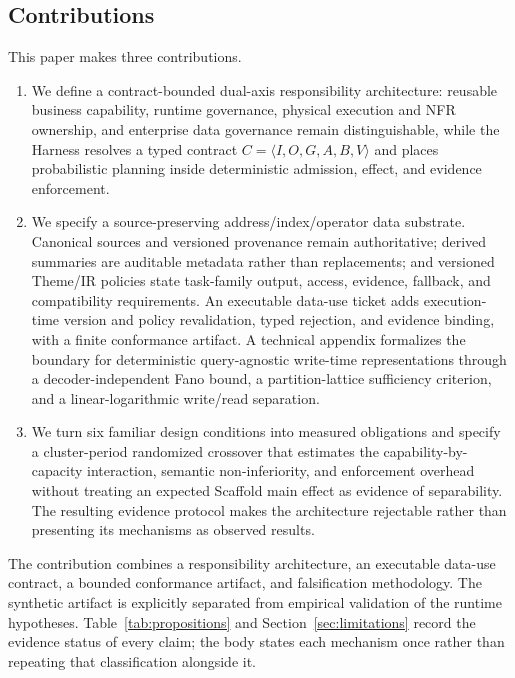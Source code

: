 \subsection{Contributions}

This paper makes three contributions.

\begin{enumerate}
\item We define a contract-bounded dual-axis responsibility architecture: reusable business capability, runtime governance, physical execution and NFR ownership, and enterprise data governance remain distinguishable, while the Harness resolves a typed contract $C=\langle I,O,G,A,B,V\rangle$ and places probabilistic planning inside deterministic admission, effect, and evidence enforcement.
\item We specify a source-preserving address/index/operator data substrate. Canonical sources and versioned provenance remain authoritative; derived summaries are auditable metadata rather than replacements; and versioned Theme/IR policies state task-family output, access, evidence, fallback, and compatibility requirements. An executable data-use ticket adds execution-time version and policy revalidation, typed rejection, and evidence binding, with a finite conformance artifact. A technical appendix formalizes the boundary for deterministic query-agnostic write-time representations through a decoder-independent Fano bound, a partition-lattice sufficiency criterion, and a linear-logarithmic write/read separation.
\item We turn six familiar design conditions into measured obligations and specify a cluster-period randomized crossover that estimates the capability-by-capacity interaction, semantic non-inferiority, and enforcement overhead without treating an expected Scaffold main effect as evidence of separability. The resulting evidence protocol makes the architecture rejectable rather than presenting its mechanisms as observed results.
\end{enumerate}

The contribution combines a responsibility architecture, an executable data-use contract, a bounded conformance artifact, and falsification methodology. The synthetic artifact is explicitly separated from empirical validation of the runtime hypotheses. Table~\ref{tab:propositions} and Section~\ref{sec:limitations} record the evidence status of every claim; the body states each mechanism once rather than repeating that classification alongside it.

